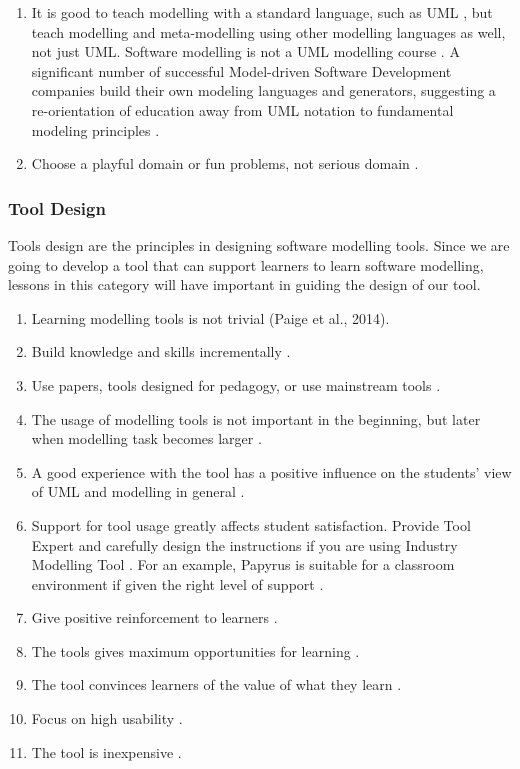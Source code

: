 \documentclass[12pt, a4paper]{report}
\begin{document}
\begin{enumerate}
\item It is good to teach modelling with a standard language, such as UML \cite{bezivin2009teaching}, but teach modelling and meta-modelling using other modelling languages as well, not just UML. Software modelling is not a UML modelling course \cite{paige2014bad}. A significant number of successful Model-driven Software Development companies build their own modeling languages and generators, suggesting a re-orientation of education away from UML notation to fundamental modeling principles \cite{whittle2013industrial}.
\item Choose a playful domain or fun problems, not serious domain \cite{paige2014bad}.
\end{enumerate}

\subsubsection{Tool Design}
Tools design are the principles in designing software modelling tools. Since we are going to develop a tool that can support learners to learn software modelling, lessons in this category will have important in guiding the design of our tool. 
\begin{enumerate}
\item Learning modelling tools is not trivial (Paige et al., 2014). 
\item Build knowledge and skills incrementally \cite{lethbridge2014teaching}.
\item Use papers, tools designed for pedagogy, or use mainstream tools \cite{Akayama2013}.
\item The usage of modelling tools is not important in the beginning, but later when modelling task becomes larger \cite{bezivin2009teaching}.
\item A good experience with the tool has a positive inﬂuence on the students’ view of UML and modelling in general \cite{liebel2015ready}.
\item Support for tool usage greatly affects student satisfaction. Provide Tool Expert and carefully design the instructions if you are using Industry Modelling Tool \cite{liebel2015ready}. For an example, Papyrus is suitable for a classroom environment if given the right level of support \cite{liebel2015ready}.
\item Give positive reinforcement to learners \cite{lethbridge2014teaching}.
\item The tools gives maximum opportunities for learning \cite{lethbridge2014teaching}.
\item The tool convinces learners of the value of what they learn \cite{lethbridge2014teaching}.
\item Focus on high usability \cite{lethbridge2014teaching}.
\item The tool is inexpensive \cite{lethbridge2014teaching}.
\end{enumerate}
\end{document}
